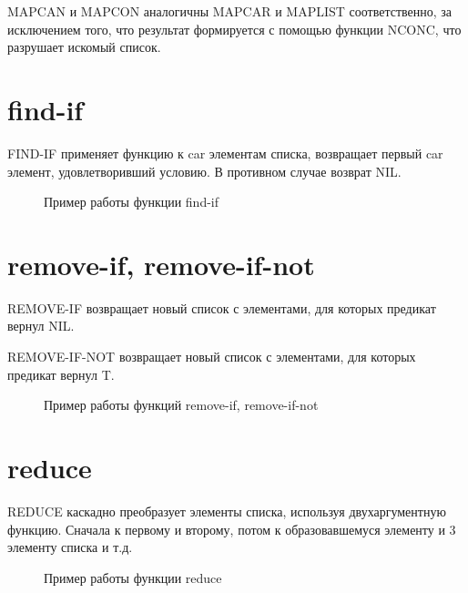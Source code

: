 MAPCAN и MAPCON аналогичны MAPCAR и MAPLIST соответственно, за 
исключением того, что результат формируется с помощью функции 
NCONC, что разрушает искомый список.

\section{find-if}

FIND-IF применяет функцию к car элементам списка, возвращает
первый car элемент, удовлетворивший условию. В противном случае
возврат NIL.

\begin{figure}[H]
    \begin{listingbox}{}
        
    \end{listingbox}
    \caption{Пример работы функции find-if}
    \label{lst:find-if-example}
\end{figure}

\section{remove-if, remove-if-not}

REMOVE-IF возвращает новый список с элементами,
для которых предикат вернул NIL.

REMOVE-IF-NOT возвращает новый список с элементами,
для которых предикат вернул T.

\begin{figure}[H]
    \begin{listingbox}{}
        
    \end{listingbox}
    \caption{Пример работы функций remove-if, remove-if-not}
    \label{lst:remove-if-remove-if-not-example}
\end{figure}

\section{reduce}

REDUCE каскадно преобразует элементы списка, используя
двухаргументную функцию. Сначала к первому и второму, потом к 
образовавшемуся элементу и 3 элементу списка и т.д.

\begin{figure}[H]
    \begin{listingbox}{}
        
    \end{listingbox}
    \caption{Пример работы функции reduce}
    \label{lst:reduce-example}
\end{figure}

